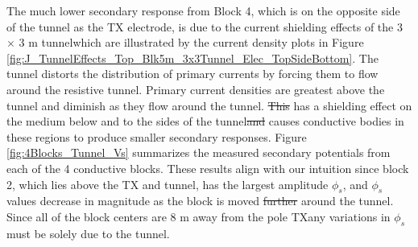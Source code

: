 \documentclass[preprint,authoryear,12pt]{elsarticle}
\providecommand{\DIFaddtex}[1]{{\protect\color{blue}\uwave{#1}}} %
\providecommand{\DIFdeltex}[1]{{\protect\color{red}\sout{#1}}}                      %
\providecommand{\DIFaddbegin}{} %
\providecommand{\DIFaddend}{} %
\providecommand{\DIFdelbegin}{} %
\providecommand{\DIFdelend}{} %
\providecommand{\DIFadd}[1]{\texorpdfstring{\DIFaddtex{#1}}{#1}} %
\providecommand{\DIFdel}[1]{\texorpdfstring{\DIFdeltex{#1}}{}} %
\begin{document}
The much lower secondary response from Block 4, which is on the opposite side of the tunnel as the TX electrode, is due to the current shielding effects of the 3 $\times$ 3 m tunnel\DIFaddbegin \DIFadd{, }\DIFaddend which are illustrated by the current density plots in Figure \ref{fig:J_TunnelEffects_Top_Blk5m_3x3Tunnel_Elec_TopSideBottom}. The tunnel distorts the distribution of primary currents by forcing them to flow around the resistive tunnel. Primary current densities are greatest above the tunnel and diminish as they flow around the tunnel. \DIFdelbegin \DIFdel{This }\DIFdelend \DIFaddbegin \DIFadd{The tunnel }\DIFaddend has a shielding effect on the medium below and to the sides of the tunnel\DIFdelbegin \DIFdel{and }\DIFdelend \DIFaddbegin \DIFadd{, which }\DIFaddend causes conductive bodies in these regions to produce smaller secondary responses. Figure \ref{fig:4Blocks_Tunnel_Vs} summarizes the measured secondary potentials from each of the 4 conductive blocks. These results align with our intuition since block 2, which lies above the TX and tunnel, has the largest amplitude $\phi_{s}$, and $\phi_{s}$ values decrease in magnitude as the block is moved \DIFdelbegin \DIFdel{further }\DIFdelend \DIFaddbegin \DIFadd{farther }\DIFaddend around the tunnel. Since all of the block centers are 8 m away from the pole TX\DIFaddbegin \DIFadd{, }\DIFaddend any variations in $\phi_{s}$ must be solely due to the tunnel.
\end{document}
